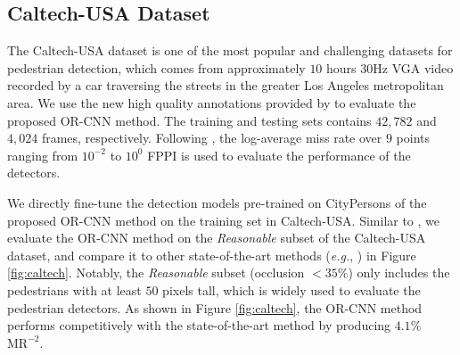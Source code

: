 \documentclass[runningheads]{llncs}
\def\eg{{\em e.g.}}
\begin{document}
\subsection{Caltech-USA Dataset}
The Caltech-USA dataset \cite{DBLP:journals/pami/DollarWSP12} is one of the most popular and challenging datasets for pedestrian detection, which comes from approximately $10$ hours $30$Hz VGA video recorded by a car traversing the streets in the greater Los Angeles metropolitan area. We use the new high quality annotations provided by \cite{DBLP:conf/cvpr/ZhangBOHS16} to evaluate the proposed OR-CNN method. The training and testing sets contains $42,782$ and $4,024$ frames, respectively. Following \cite{DBLP:journals/pami/DollarWSP12}, the log-average miss rate over $9$ points ranging from $10^{-2}$ to $10^{0}$ FPPI is used to evaluate the performance of the detectors.

We directly fine-tune the detection models pre-trained on CityPersons \cite{DBLP:conf/cvpr/ZhangBS17} of the proposed OR-CNN method on the training set in Caltech-USA. Similar to \cite{DBLP:journals/corr/abs-1711-07752}, we evaluate the OR-CNN method on the {\em Reasonable} subset of the Caltech-USA dataset, and compare it to other state-of-the-art methods (\eg, \cite{DBLP:journals/corr/abs-1711-07752,DBLP:conf/cvpr/ZhangBS15,DBLP:conf/cvpr/TianLWT15,DBLP:conf/eccv/CaiFFV16,DBLP:conf/iccv/CaiSV15,DBLP:conf/eccv/ZhangLLH16,DBLP:conf/cvpr/MaoXJC17,DBLP:journals/tm/li2017scale,DBLP:conf/iccv/TianLWT15,DBLP:conf/cvpr/CosteaN16,DBLP:conf/icpr/Ohn-BarT16a,DBLP:conf/wacv/DuELD17}) in Figure \ref{fig:caltech}. Notably, the {\em Reasonable} subset (occlusion $<35\%$) only includes the pedestrians with at least $50$ pixels tall, which is widely used to evaluate the pedestrian detectors. As shown in Figure \ref{fig:caltech}, the OR-CNN method performs competitively with the state-of-the-art method \cite{DBLP:journals/corr/abs-1711-07752} by producing $4.1\%$ $\text{MR}^{-2}$.
\end{document}
